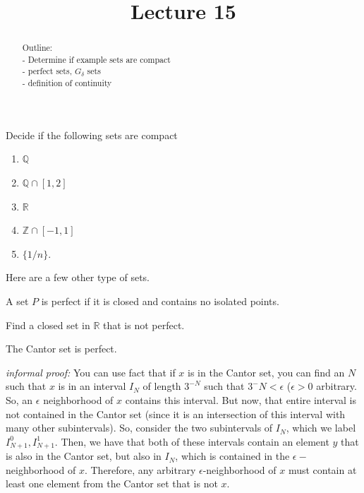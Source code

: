 \documentclass{ximera}
\begin{document}
    \title{Lecture 15}
    
    \begin{abstract}  
    Outline: \\
    - Determine if example sets are compact
    \\
    - perfect sets, $G_\delta$ sets \\
    - definition of continuity
\end{abstract}

\maketitle


Decide if the following sets are compact
\begin{enumerate}
    \item $\mathbb{Q}$
    \item  $\mathbb{Q}\cap [1,2]$
    \item  $\mathbb{R}$
    \item $\mathbb{Z}\cap [-1,1]$
    \item $\{1/n\}$.
\end{enumerate}

Here are a few other type of sets.

\begin{definition}
A set $P$ is perfect if it is closed and contains no isolated points.    
\end{definition}

\begin{exercise}
    Find a closed set in $\mathbb{R}$ that is not perfect.
\end{exercise}

\begin{theorem}
    The Cantor set is perfect.
\end{theorem}
\textit{informal proof:}
You can use fact that if $x$ is in the Cantor set, you can find an $N$ such that $x$ is in an interval $I_N$ of length $3^{-N}$ such that $3^-N < \epsilon$ ($\epsilon > 0$ arbitrary.  So, an $\epsilon$ neighborhood of $x$ contains this interval.  But now, that entire interval is not contained in the Cantor set (since it is an intersection of this interval with many other subintervals).  So, consider the two subintervals of $I_N$, which we label $I_{N+1}^0, I_{N+1}^1$.  Then, we have that both of these intervals contain an element $y$ that is also in the Cantor set, but also in $I_N$, which is contained in the $\epsilon-$ neighborhood of $x$.  Therefore, any arbitrary $\epsilon$-neighborhood of $x$ must contain at least one element from the Cantor set that is not $x$. 
\end{document}
